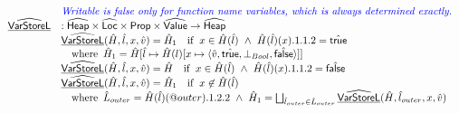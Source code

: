 \[\begin{array}{ll}
& {\color{blue} \textit{Writable is false only for function name variables, which is always determined exactly.}} \\
\widehat{\underline{\sf VarStoreL}} & : \widehat{\mbox{\textsf{Heap}}} \times \widehat{\mbox{\textsf{Loc}}} \times \mbox{\textsf{Prop}} \times \widehat{\mbox{\textsf{Value}}} \rightarrow \widehat{\mbox{\textsf{Heap}}}\\
& \widehat{\underline{\sf VarStoreL}}(\hat{H}, \hat{l}, x, \hat{v}) = \hat{H}_1 \quad{\rm if}\begin{array}[t]{l}x \in \hat{H}(\hat{l}) ~\land~ \hat{H}(\hat{l})(x).1.1.2 = \hat{\mbox{\textsf{true}}}\end{array}\\
&   \quad{\rm where}\begin{array}[t]{l}\hat{H}_1 = \hat{H}[\hat{l} \mapsto \hat{H}(l)[x \mapsto \langle \hat{v},\hat{\mbox{\textsf{true}}},\bot_{Bool},\hat{\mbox{\textsf{false}}} \rangle]]\end{array} \\
& \widehat{\underline{\sf VarStoreL}}(\hat{H}, \hat{l}, x, \hat{v}) = \hat{H} \quad{\rm if}\begin{array}[t]{l}x \in \hat{H}(\hat{l}) ~\land~ \hat{H}(\hat{l})(x).1.1.2 = \hat{\mbox{\textsf{false}}}\end{array}\\
& \widehat{\underline{\sf VarStoreL}}(\hat{H}, \hat{l}, x, \hat{v}) = \hat{H}_1 \quad{\rm if}\begin{array}[t]{l}x \not\in \hat{H}(\hat{l})\end{array} \\
&   \quad{\rm where}\begin{array}[t]{l}\hat{L}_{outer} = \hat{H}(\hat{l})(@outer).1.2.2 ~\land~ 
    \hat{H}_1 = \bigsqcup_{\hat{l}_{outer}\in\hat{L}_{outer}}\widehat{\underline{\sf VarStoreL}}(\hat{H}, \hat{l}_{outer}, x, \hat{v})\end{array} \\


\\



\end{array}\]
